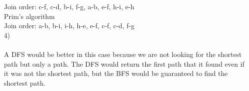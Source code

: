 \documentclass{article}
\begin{document}
Join order: c-f, c-d, b-i, f-g, a-b, e-f, h-i, e-h\\
Prim's algorithm\\
Join order: a-b, b-i, i-h, h-e, e-f, c-f, c-d, f-g\\ 
4)\\
\\
A DFS would be better in this case because we are not looking for the shortest path but only a
path. The DFS would return the first path that it found even if it was not the shortest path, 
but the BFS would be guaranteed to find the shortest path.
\end{document}
